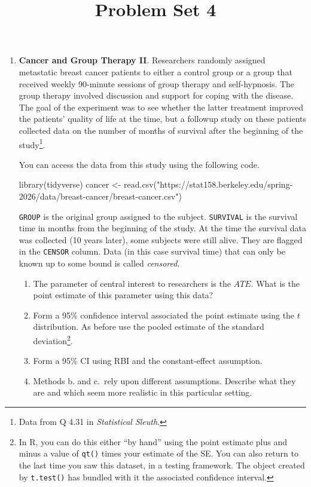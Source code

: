 \documentclass[
  letterpaper,
  DIV=11,
  numbers=noendperiod]{scrartcl}
\title{Problem Set 4}
\author{}
\date{}
\newenvironment{Shaded}{\begin{snugshade}}{\end{snugshade}}
\newcommand{\FunctionTok}[1]{\textcolor[rgb]{0.28,0.35,0.67}{#1}}
\newcommand{\NormalTok}[1]{\textcolor[rgb]{0.00,0.23,0.31}{#1}}
\newcommand{\OtherTok}[1]{\textcolor[rgb]{0.00,0.23,0.31}{#1}}
\newcommand{\StringTok}[1]{\textcolor[rgb]{0.13,0.47,0.30}{#1}}
\providecommand{\tightlist}{%
  \setlength{\itemsep}{0pt}\setlength{\parskip}{0pt}}
\begin{document}
\maketitle


\begin{enumerate}
\def\labelenumi{\arabic{enumi}.}
\item
  \textbf{Cancer and Group Therapy II}. Researchers randomly assigned
  metastatic breast cancer patients to either a control group or a group
  that received weekly 90-minute sessions of group therapy and
  self-hypnosis. The group therapy involved discussion and support for
  coping with the disease. The goal of the experiment was to see whether
  the latter treatment improved the patients' quality of life at the
  time, but a followup study on these patients collected data on the
  number of months of survival after the beginning of the
  study\footnote{Data from Q 4.31 in \emph{Statistical Sleuth}.}.

  You can access the data from this study using the following code.

\begin{Shaded}
\begin{Highlighting}[]
\FunctionTok{library}\NormalTok{(tidyverse)}
\NormalTok{cancer }\OtherTok{\textless{}{-}} \FunctionTok{read.csv}\NormalTok{(}\StringTok{"https://stat158.berkeley.edu/spring{-}2026/data/breast{-}cancer/breast{-}cancer.csv"}\NormalTok{)}
\end{Highlighting}
\end{Shaded}

  \texttt{GROUP} is the original group assigned to the subject.
  \texttt{SURVIVAL} is the survival time in months from the beginning of
  the study. At the time the survival data was collected (10 years
  later), some subjects were still alive. They are flagged in the
  \texttt{CENSOR} column. Data (in this case survival time) that can
  only be known up to some bound is called \emph{censored}.

  \begin{enumerate}
  \def\labelenumii{\alph{enumii}.}
  \tightlist
  \item
    The parameter of central interest to researchers is the \(ATE\).
    What is the point estimate of this parameter using this data?
  \item
    Form a 95\% confidence interval associated the point estimate using
    the \(t\) distribution. As before use the pooled estimate of the
    standard deviation\footnote{In R, you can do this either ``by hand''
      using the point estimate plus and minus a value of \texttt{qt()}
      times your estimate of the SE. You can also return to the last
      time you saw this dataset, in a testing framework. The object
      created by \texttt{t.test()} has bundled with it the associated
      confidence interval.}.
  \item
    Form a 95\% CI using RBI and the constant-effect assumption.
  \item
    Methods b. and c.~rely upon different assumptions. Describe what
    they are and which seem more realistic in this particular setting.
  \end{enumerate}
\end{enumerate}
\end{document}

